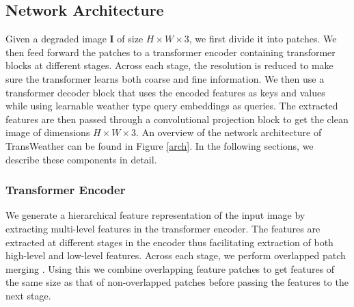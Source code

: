 \documentclass[10pt,twocolumn,letterpaper]{article}
\begin{document}
\subsection{Network Architecture}
Given a degraded image \textbf{I} of size $H \times W \times 3$, we first divide it into patches. We then feed forward the patches to a transformer encoder containing transformer blocks at different stages. Across each stage, the resolution is reduced to make sure the transformer learns both coarse and fine information. We then use a transformer decoder block that uses the encoded features as keys and values while using learnable weather type query embeddings as queries. The extracted features are then passed through a convolutional projection block to get the clean image of dimensions $H \times W \times 3$. An overview of the network architecture of TransWeather can be found in Figure \ref{arch}. In the following sections, we describe these components in detail.

\subsubsection{Transformer Encoder}

We generate a hierarchical feature representation of the input image by extracting multi-level features in the transformer encoder. The features are extracted at different stages in the encoder thus facilitating extraction of both  high-level and low-level features. Across each stage, we perform overlapped patch merging \cite{xie2021segformer}. Using this we combine overlapping feature patches to get features of the same size as that of non-overlapped patches before passing the features to the next stage.  
\end{document}
